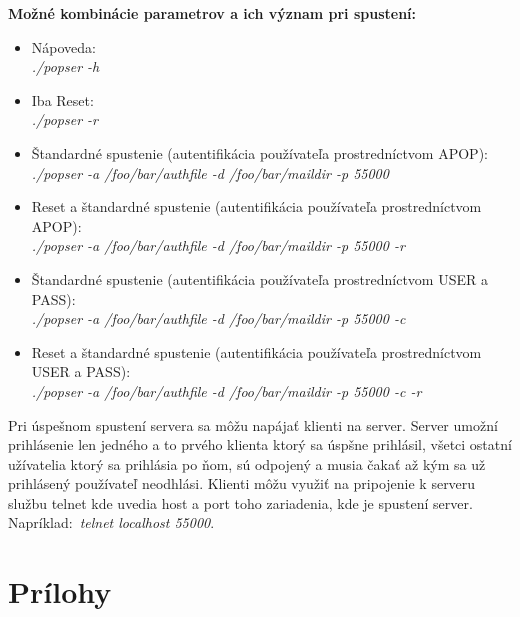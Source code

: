 \documentclass[11pt,a4paper]{article}
\begin{document}
	\textbf{Možné kombinácie parametrov a ich význam pri spustení:}
	\begin{itemize}

		\item Nápoveda:\\[0.1em]
		\textit{./popser -h}

		\item Iba Reset:\\[0.1em]
		\textit{./popser -r}

		\item Štandardné spustenie (autentifikácia používateľa prostredníctvom APOP):\\[0.1em]
		\textit{./popser -a /foo/bar/authfile -d /foo/bar/maildir -p 55000}

		\item Reset a štandardné spustenie (autentifikácia používateľa prostredníctvom APOP):\\[0.1em]
		\textit{./popser -a /foo/bar/authfile -d /foo/bar/maildir -p 55000 -r}

		\item Štandardné spustenie (autentifikácia používateľa prostredníctvom USER a PASS):\\[0.1em]
		\textit{./popser -a /foo/bar/authfile -d /foo/bar/maildir -p 55000 -c}

		\item Reset a štandardné spustenie (autentifikácia používateľa prostredníctvom USER a PASS):\\[0.1em]
		\textit{./popser -a /foo/bar/authfile -d /foo/bar/maildir -p 55000 -c -r }

	\end{itemize}

	Pri úspešnom spustení servera sa môžu napájať klienti na server. Server umožní prihlásenie len jedného a to prvého klienta ktorý sa úspšne prihlásil, všetci ostatní užívatelia ktorý sa prihlásia po ňom, sú odpojený a musia čakať až kým sa už prihlásený používateľ neodhlási. Klienti môžu využiť na pripojenie k serveru službu telnet kde uvedia host a port toho zariadenia, kde je spustení server. Napríklad: \textit{telnet localhost 55000}.

\newpage %

\section{Prílohy}
\end{document}
